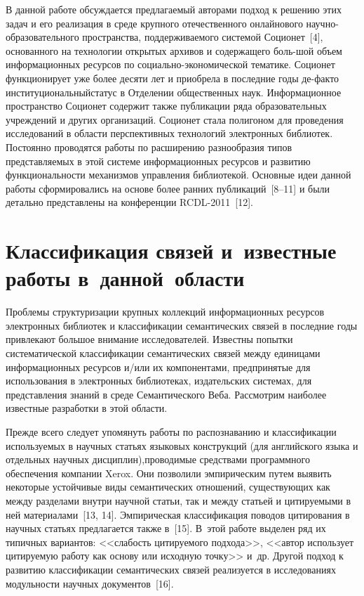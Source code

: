 \begin{multicols}{2}
     В данной работе обсуждается предлагаемый авторами подход к решению 
этих задач и его реализация в среде крупного отечественного онлайнового 
     на\-уч\-но-об\-ра\-зо\-ва\-тель\-но\-го пространства, поддерживаемого 
системой Соционет~[4], основанного на технологии открытых архивов и 
содержащего боль-\linebreak шой объем информационных ресурсов по со\-ци\-ально-эко\-но\-ми\-че\-ской 
тематике. Соционет функ\-ци\-о\-нирует уже более десяти лет и 
приобрела в послед\-ние годы де-фак\-то институциональный\linebreak статус в Отделении 
общественных наук. Информационное пространство Соционет содержит 
также публикации ряда образовательных учреждений и \mbox{других} организаций. 
Соционет стала полигоном для проведения исследований в области 
перспективных технологий электронных библиотек. Постоянно проводятся 
работы по расширению разнообразия типов представляемых в этой системе 
информационных ресурсов и развитию функциональности механизмов 
управления библиотекой. Основные идеи данной работы сформировались на 
основе более ранних публикаций~[8--11] и были детально представлены на 
конференции RCDL-2011~[12]. 

\vspace*{-6pt}

\section{Классификация связей и~известные работы в~данной~области}

\vspace*{-2pt}

  Проблемы структуризации крупных коллекций информационных ресурсов 
электронных биб\-лио\-тек и классификации семантических связей в послед\-ние 
годы привлекают большое внимание исследователей. Известны попытки 
систематической классификации семантических связей между единицами 
информационных ресурсов и/или их компонентами, предпринятые для 
использования в электронных библиотеках, издательских системах, для 
представления знаний в среде Семантического Веба. Рассмотрим наиболее 
известные разработки в этой области.
  
  Прежде всего следует упомянуть работы по распознаванию и классификации 
используемых в научных статьях языковых конструкций (для английского 
языка и отдельных научных дисциплин),\linebreak проводимые средствами 
программного обеспечения компании {Xerox}. Они позволили 
эмпирическим путем выявить некоторые устойчивые виды семантических 
отношений, существующих как между разделами внутри научной статьи, так и 
между статьей и цитируемыми в ней материалами~[13, 14]. Эмпирическая 
классификация поводов цитирования в научных статьях предлагается также 
в~[15]. В~этой работе выделен ряд их типичных вариантов: <<слабость 
цитируемого подхода>>, <<автор использует цитируемую работу как основу 
или исходную точку>> и~др. Другой подход к развитию классификации 
семантических связей реализуется в исследованиях модульности научных 
документов~[16]. 
  

\end{multicols}
